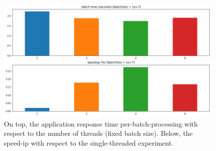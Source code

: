 \documentclass[a4paper, 11pt]{article}
\begin{document}
\begin{figure}[h]
    \centering
    \includegraphics[width=1\textwidth]{Performance/speedup_analysis_12_1.png}
    \caption{On top, the application response time per-batch-processing with respect to the number of threads (fixed batch size). Below, the speed-ip with respect to the single-threaded experiment.}
    \label{fig:perf2}
\end{figure}
\end{document}

